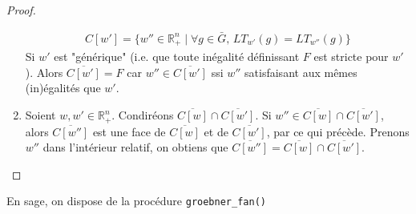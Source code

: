 \begin{proof}
\begin{enumerate}
                \begin{align*}
                    C[w'] = \{w'' \in \mathbb{R}_+^n \mid \forall g \in \bar G,\, LT_{w'}(g) = LT_{w''}(g) \}
                \end{align*}
                Si $w'$ est "générique" (i.e. que toute inégalité définissant $F$ est stricte pour $w'$). Alors $\overline{C[w']} = F$ car $w'' \in \overline{C[w']}$ ssi $w''$ satisfaisant aux mêmes (in)égalités que $w'$.
                \item Soient $w,w' \in \mathbb{R}_+^n$. Condiréons $\overline{C[w]} \cap \overline{C[w']}$. Si $w'' \in \overline{C[w]} \cap \overline{C[w']}$, alors $\overline{C[w'']}$ est une face de $\overline{C[w]}$ et de $\overline{C[w']}$, par ce qui précède. Prenons $w''$ dans l'intérieur relatif, on obtiens que $\overline{C[w'']} = \overline{C[w]} \cap \overline{C[w']}$.
            \end{enumerate}
        \end{proof}
        \begin{remq}
            En sage, on dispose de la procédure \texttt{groebner_fan()}
        \end{remq}

